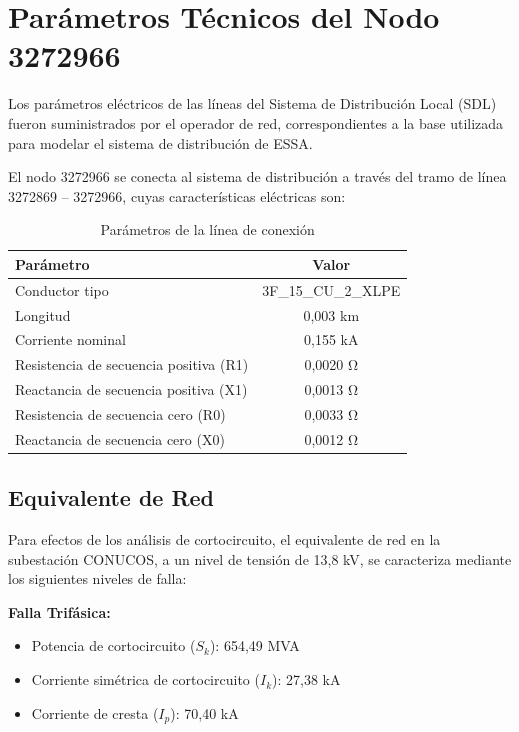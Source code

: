\section{Parámetros Técnicos del Nodo 3272966}

Los parámetros eléctricos de las líneas del Sistema de Distribución Local (SDL) fueron suministrados por el operador de red, correspondientes a la base utilizada para modelar el sistema de distribución de ESSA.

El nodo 3272966 se conecta al sistema de distribución a través del tramo de línea 3272869 – 3272966, cuyas características eléctricas son:

\begin{table}[H]
    \centering
    \caption{Parámetros de la línea de conexión}
    \begin{tabular}{lc}
    \toprule
    \textbf{Parámetro} & \textbf{Valor} \\
    \midrule
    Conductor tipo & 3F\_15\_CU\_2\_XLPE \\
    Longitud & 0,003 km \\
    Corriente nominal & 0,155 kA \\
    Resistencia de secuencia positiva (R1) & 0,0020 Ω \\
    Reactancia de secuencia positiva (X1) & 0,0013 Ω \\
    Resistencia de secuencia cero (R0) & 0,0033 Ω \\
    Reactancia de secuencia cero (X0) & 0,0012 Ω \\
    \bottomrule
    \end{tabular}
\end{table}

\subsection{Equivalente de Red}

Para efectos de los análisis de cortocircuito, el equivalente de red en la subestación CONUCOS, a un nivel de tensión de 13,8 kV, se caracteriza mediante los siguientes niveles de falla:

\textbf{Falla Trifásica:}
\begin{itemize}
    \item Potencia de cortocircuito ($S_k$): 654,49 MVA
    \item Corriente simétrica de cortocircuito ($I_k$): 27,38 kA
    \item Corriente de cresta ($I_p$): 70,40 kA
\end{itemize}

